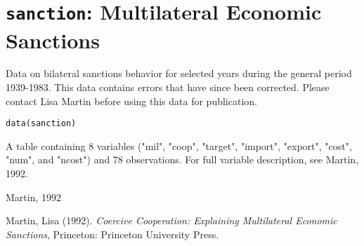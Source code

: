  \section{{\tt sanction}: Multilateral Economic Sanctions}\label{ss:sanction}
\begin{Description}\relax
Data on bilateral sanctions behavior for selected years during the
general period 1939-1983.  This data contains errors that have since
been corrected.  Please contact Lisa Martin before using this data for
publication.
\end{Description}
\begin{Usage}
\begin{verbatim}data(sanction)\end{verbatim}
\end{Usage}
\begin{Format}\relax
A table containing 8 variables ("mil", "coop", "target",
"import", "export", "cost", "num", and "ncost") and 78 observations.
For full variable description, see Martin, 1992.
\end{Format}
\begin{Source}\relax
Martin, 1992
\end{Source}
\begin{References}\relax
Martin, Lisa (1992).  \emph{Coercive Cooperation: Explaining Multilateral
Economic Sanctions}, Princeton: Princeton University Press.
\end{References}


